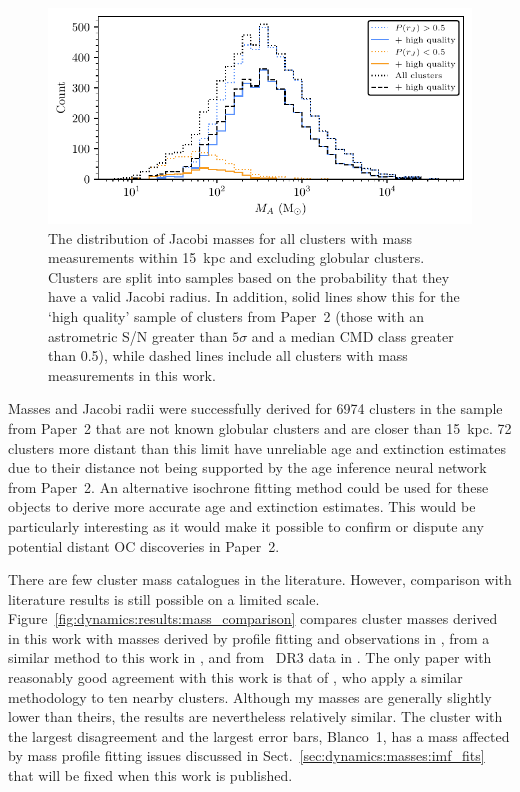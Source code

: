 \begin{figure}[t]
    \centering
    \includegraphics[width=\textwidth]{fig/c4/results_mass_distribution.pdf}
    \caption[The distribution of Jacobi masses for all clusters with mass measurements within 15~kpc]{The distribution of Jacobi masses for all clusters with mass measurements within 15~kpc and excluding globular clusters. Clusters are split into samples based on the probability that they have a valid Jacobi radius. In addition, solid lines show this for the `high quality' sample of clusters from Paper~2 (those with an astrometric S/N greater than $5\sigma$ and a median CMD class greater than 0.5), while dashed lines include all clusters with mass measurements in this work.}
    \label{fig:dynamics:results:mass_distribution}
\end{figure}

Masses and Jacobi radii were successfully derived for 6974 clusters in the sample from Paper~2 that are not known globular clusters and are closer than 15~kpc. 72 clusters more distant than this limit have unreliable age and extinction estimates due to their distance not being supported by the age inference neural network from Paper~2. An alternative isochrone fitting method could be used for these objects to derive more accurate age and extinction estimates. This would be particularly interesting as it would make it possible to confirm or dispute any potential distant OC discoveries in Paper~2.


There are few cluster mass catalogues in the literature. However, comparison with literature results is still possible on a limited scale. Figure~\ref{fig:dynamics:results:mass_comparison} compares cluster masses derived in this work with masses derived by profile fitting and observations in \cite{piskunov_tidal_2008}, from a similar method to this work in \cite{meingast_extended_2021}, and from \gaia\ DR3 data in \cite{cordoni_photometric_binaries_2023}. The only paper with reasonably good agreement with this work is that of \cite{meingast_extended_2021}, who apply a similar methodology to ten nearby clusters. Although my masses are generally slightly lower than theirs, the results are nevertheless relatively similar. The cluster with the largest disagreement and the largest error bars, Blanco~1, has a mass affected by mass profile fitting issues discussed in Sect.~\ref{sec:dynamics:masses:imf_fits} that will be fixed when this work is published.

